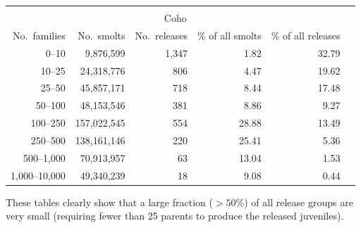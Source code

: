 \documentclass[11pt]{article}
\begin{document}
\begin{table}
\begin{center}
\begin{tabular}{rrrrrr}
\\
\mbox{}\\
\multicolumn{5}{c}{Coho}\\
No.~families  &  No.~smolts  &  No.~releases  &  \% of all smolts  &  \% of all releases \\ \hline
0--10  &    9,876,599  &  1,347  &  1.82  &  32.79\\
10--25  &   24,318,776  &    806  &  4.47  &  19.62\\
25--50  &   45,857,171  &    718  &  8.44  &  17.48\\
50--100  &   48,153,546  &    381  &  8.86  &  9.27\\
100--250  &  157,022,545  &    554  &  28.88  &  13.49\\
250--500  &  138,161,146  &    220  &  25.41  &  5.36\\
500--1,000  &   70,913,957  &     63  &  13.04  &  1.53\\
1,000--10,000  &   49,340,239  &     18  &  9.08  &  0.44\\
\hline\hline
\end{tabular}
\end{center}
\end{table}
These tables clearly show that a large fraction ($>50\%$) of all release groups are very small (requiring fewer than 25 parents to produce the released juveniles).
\end{document}

